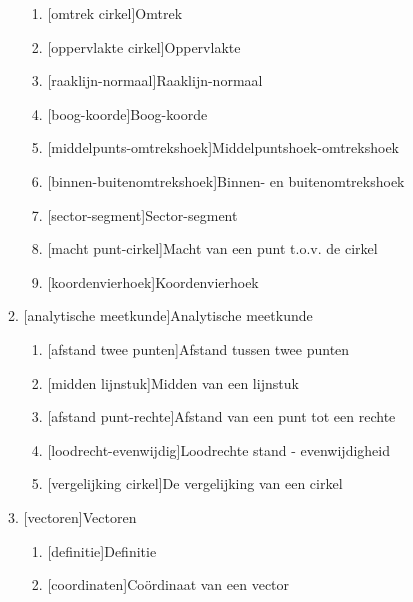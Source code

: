 \documentclass{article}
\begin{document}
\begin{itemize}
\begin{enumerate}
\begin{enumerate}%
\item {}[omtrek cirkel]{Omtrek}
\item {}[oppervlakte cirkel]{Oppervlakte}
\item {}[raaklijn-normaal]{Raaklijn-normaal}
\item {}[boog-koorde]{Boog-koorde}
\item {}[middelpunts-omtrekshoek]{Middelpuntshoek-omtrekshoek}
\item {}[binnen-buitenomtrekshoek]{Binnen- en buitenomtrekshoek}
\item {}[sector-segment]{Sector-segment}
\item {}[macht punt-cirkel]{Macht van een punt t.o.v. de cirkel}
\item {}[koordenvierhoek]{Koordenvierhoek}
\end{enumerate}%
\item {}[analytische meetkunde]{Analytische meetkunde}
\begin{enumerate}%
\item {}[afstand twee punten]{Afstand tussen twee punten}
\item {}[midden lijnstuk]{Midden van een lijnstuk}
\item {}[afstand punt-rechte]{Afstand van een punt tot een rechte}
\item {}[loodrecht-evenwijdig]{Loodrechte stand - evenwijdigheid}
\item {}[vergelijking cirkel]{De vergelijking van een cirkel}
\end{enumerate}%
\item {}[vectoren]{Vectoren}
\begin{enumerate}%
\item {}[definitie]{Definitie}
\item {}[coordinaten]{Co\"ordinaat van een vector}

\end{enumerate}
\end{enumerate}
\end{itemize}
\end{document}
